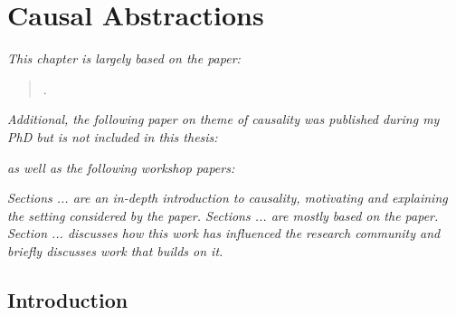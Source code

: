 \chapter{Causal Abstractions}\label{chapter:causality}

\ifpdf
    \graphicspath{{Chapter3/Figs/Raster/}{Chapter3/Figs/PDF/}{Chapter3/Figs/}}
\else
    \graphicspath{{Chapter3/Figs/Vector/}{Chapter3/Figs/}}
\fi

\emph{This chapter is largely based on the paper:}


\begin{quote}
.
\end{quote}


\emph{Additional, the following paper on theme of causality was published during my PhD but is not included in this thesis:}

\begin{quote}
\end{quote}

\emph{as well as the following workshop papers:}

\begin{quote}
\end{quote}

\begin{quote}
\end{quote}

\emph{Sections ... are an in-depth introduction to causality, motivating and explaining the setting considered by the paper.
Sections ... are mostly based on the paper. 
Section ... discusses how this work has influenced the research community and briefly discusses work that builds on it.}



\section{Introduction}

